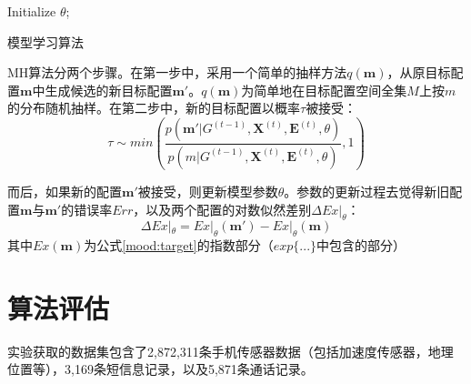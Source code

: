 \begin{algorithm}
{}

Initialize $\theta$;


\caption{模型学习算法}
\label{mood:alg:learning}
\end{algorithm}

MH算法分两个步骤。在第一步中，采用一个简单的抽样方法$q(\mathbf{m})$，从原目标配置$\mathbf{m}$中生成候选的新目标配置$\mathbf{m'}$。$q(\mathbf{m})$为简单地在目标配置空间全集$M$上按$m$的分布随机抽样。在第二步中，新的目标配置以概率$\tau$被接受：
\begin{equation}
\tau \sim min(\frac{p(\mathbf{m'}|G^{(t-1)}, \mathbf{X}^{(t)}, \mathbf{E}^{(t)}, \theta)}{p(m|G^{(t-1)}, \mathbf{X}^{(t)}, \mathbf{E}^{(t)}, \theta)}, 1)
\end{equation}

而后，如果新的配置$\mathbf{m'}$被接受，则更新模型参数$\theta$。参数的更新过程去觉得新旧配置$\mathbf{m}$与$\mathbf{m'}$的错误率$Err$，以及两个配置的对数似然差别$\Delta Ex|_\theta$： 
\[\Delta Ex|_\theta = Ex|_\theta (\mathbf{m'}) - Ex|_\theta(\mathbf{m})\] 
其中$Ex(\mathbf{m})$为公式\ref{mood:target}的指数部分（$exp\{...\}$中包含的部分）

\section{算法评估}\label{mood:evaluation}


实验获取的数据集包含了2,872,311条手机传感器数据（包括加速度传感器，地理位置等），3,169条短信息记录，以及5,871条通话记录。 

